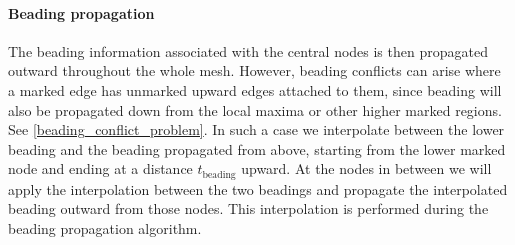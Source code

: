 \paragraph{Beading propagation}
The beading information associated with the central nodes is then propagated outward throughout the whole mesh.
However, beading conflicts can arise where a marked edge has unmarked upward edges attached to them, since beading will also be propagated down from the local maxima or other higher marked regions.
See \cref{beading_conflict_problem}.
In such a case we interpolate between the lower beading and the beading propagated from above,
starting from the lower marked node and ending at a distance $t_\text{beading}$ upward.
At the nodes in between we will apply the interpolation between the two beadings and propagate the interpolated beading outward from those nodes.
This interpolation is performed during the beading propagation algorithm.


